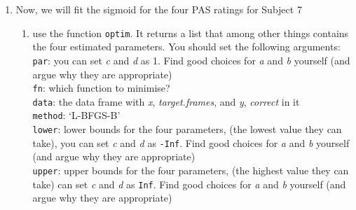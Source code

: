 \documentclass[
]{article}
\providecommand{\tightlist}{%
  \setlength{\itemsep}{0pt}\setlength{\parskip}{0pt}}
\begin{document}
\begin{enumerate}
\def\labelenumi{\arabic{enumi})}
\tightlist
\item
  Now, we will fit the sigmoid for the four PAS ratings for Subject 7

  \begin{enumerate}
  \def\labelenumii{\roman{enumii}.}
  \tightlist
  \item
    use the function \texttt{optim}. It returns a list that among other
    things contains the four estimated parameters. You should set the
    following arguments:\\
    \texttt{par}: you can set \emph{c} and \emph{d} as 1. Find good
    choices for \emph{a} and \emph{b} yourself (and argue why they are
    appropriate)\\
    \texttt{fn}: which function to minimise?\\
    \texttt{data}: the data frame with \emph{x}, \emph{target.frames},
    and \emph{y}, \emph{correct} in it\\
    \texttt{method}: `L-BFGS-B'\\
    \texttt{lower}: lower bounds for the four parameters, (the lowest
    value they can take), you can set \emph{c} and \emph{d} as
    \texttt{-Inf}. Find good choices for \emph{a} and \emph{b} yourself
    (and argue why they are appropriate)\\
    \texttt{upper}: upper bounds for the four parameters, (the highest
    value they can take) can set \emph{c} and \emph{d} as \texttt{Inf}.
    Find good choices for \emph{a} and \emph{b} yourself (and argue why
    they are appropriate)
  \end{enumerate}
\end{enumerate}
\end{document}

